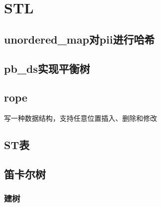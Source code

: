 \documentclass{article}
\begin{document}
\begin{titlepage}

\thispagestyle{empty}
\pagebreak
\pagestyle{plain}
\tableofcontents
\end{titlepage}

\section{STL}

\subsection{unordered\_map对pii进行哈希}

\subsection{pb\_ds实现平衡树}

\subsection{rope}
写一种数据结构，支持任意位置插入、删除和修改




\subsection{ST表}


\subsection{笛卡尔树}
\subsubsection{建树}

\end{document}

